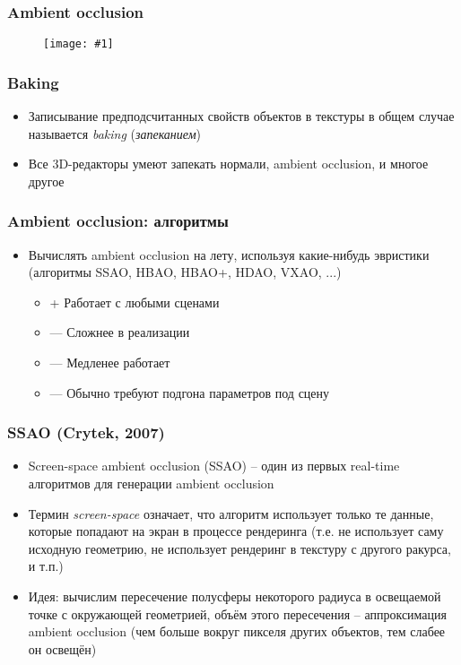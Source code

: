 \documentclass{beamer}
\newcommand{\slideimage}[1]{
  \begin{figure}
    \begin{adjustbox}{width=\textwidth, totalheight=\textheight-2\baselineskip-2\baselineskip,keepaspectratio}
      \texttt{[image: \#1]}
    \end{adjustbox}
  \end{figure}
}
\begin{document}
\begin{frame}[fragile]
\frametitle{Ambient occlusion}
\slideimage{baked-ao.png}
\end{frame}

\begin{frame}[fragile]
\frametitle{Baking}
\begin{itemize}
\item Записывание предподсчитанных свойств объектов в текстуры в общем случае называется \textit{baking} (\textit{запеканием})
\pause
\item Все 3D-редакторы умеют запекать нормали, ambient occlusion, и многое другое
\end{itemize}
\end{frame}

\begin{frame}[fragile]
\frametitle{Ambient occlusion: алгоритмы}
\begin{itemize}
\item Вычислять ambient occlusion на лету, используя какие-нибудь эвристики (алгоритмы SSAO, HBAO, HBAO+, HDAO, VXAO, ...)
\pause
\begin{itemize}
\item {\color{green}+} Работает с любыми сценами
\item {\color{red}—} Сложнее в реализации
\item {\color{red}—} Медленее работает
\item {\color{red}—} Обычно требуют подгона параметров под сцену
\end{itemize}
\end{itemize}
\end{frame}

\begin{frame}[fragile]
\frametitle{SSAO (Crytek, 2007)}
\begin{itemize}
\item Screen-space ambient occlusion (SSAO) -- один из первых real-time алгоритмов для генерации ambient occlusion
\pause
\item Термин \textit{screen-space} означает, что алгоритм использует только те данные, которые попадают на экран в процессе рендеринга (т.е. не использует саму исходную геометрию, не использует рендеринг в текстуру с другого ракурса, и т.п.)
\pause
\item Идея: вычислим пересечение полусферы некоторого радиуса в освещаемой точке с окружающей геометрией, объём этого пересечения -- аппроксимация ambient occlusion (чем больше вокруг пикселя других объектов, тем слабее он освещён)
\end{itemize}
\end{frame}
\end{document}
